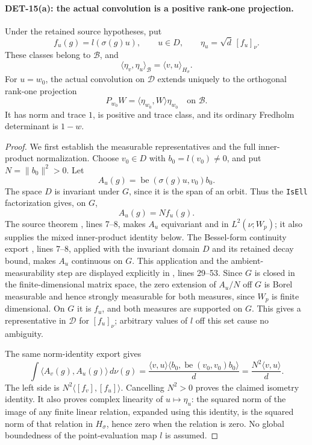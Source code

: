 \paragraph{DET-15(a): the actual convolution is a positive rank-one projection.}
Under the retained source hypotheses, put
\[
 f_u(g)=l(\sigma(g)u),\qquad u\in D,\qquad
 \eta_u=\sqrt d\,[f_u]_\nu.
\]
These classes belong to \(\mathcal B\), and
\[
 \langle\eta_v,\eta_u\rangle_{\mathcal B}
 =\langle v,u\rangle_{H_\sigma}.
\]
For \(u=w_0\), the actual convolution on \(\mathcal D\) extends
uniquely to the orthogonal rank-one projection
\[
 P_{w_0}W=\langle\eta_{w_0},W\rangle\eta_{w_0}
 \quad\text{on }\mathcal B.
\]
It has norm and trace \(1\), is positive and trace class, and its
ordinary Fredholm determinant is \(1-w\).
\begin{proof}
We first establish the measurable representatives and the full
inner-product normalization. Choose \(v_0\in D\) with
\(b_0=l(v_0)\ne0\), and put \(N=\|b_0\|^2>0\).
Let
\[
 A_u(g)=\operatorname{be}(\sigma(g)u,v_0)b_0.
\]
The space \(D\) is invariant under \(G\), since it is the span
of an orbit. Thus the \texttt{IsEll} factorization gives, on \(G\),
\[
 A_u(g)=N f_u(g).
\]
The source theorem
,
lines 7--8, makes \(A_u\) equivariant and in \(L^2(\nu;W_p)\);
it also supplies the mixed inner-product identity below.
The Bessel-form continuity export
,
lines 7--8, applied with the invariant domain \(D\) and its
retained decay bound, makes \(A_u\) continuous on \(G\).
This application and the ambient-measurability step are displayed
explicitly in
, lines 29--53.
Since \(G\) is closed in the finite-dimensional matrix space,
the zero extension of \(A_u/N\) off \(G\) is Borel measurable
and hence strongly measurable for both measures, since \(W_p\)
is finite dimensional. On \(G\) it is \(f_u\), and both measures
are supported on \(G\). This gives a representative in
\(\mathcal D\) for \([f_u]_\nu\); arbitrary values of \(l\)
off this set cause no ambiguity.

The same norm-identity export gives
\[
 \int\langle A_v(g),A_u(g)\rangle\,d\nu(g)
 =\frac{\langle v,u\rangle
       \langle b_0,\operatorname{be}(v_0,v_0)b_0\rangle}{d}
 =\frac{N^2\langle v,u\rangle}{d}.
\]
The left side is \(N^2\langle[f_v],[f_u]\rangle\).
Cancelling \(N^2>0\) proves the claimed isometry identity.
It also proves complex linearity of \(u\mapsto\eta_u\):
the squared norm of the image of any finite linear relation,
expanded using this identity, is the squared norm of that
relation in \(H_\sigma\), hence zero when the relation is zero.
No global boundedness of the point-evaluation map \(l\) is assumed.


\end{proof}
